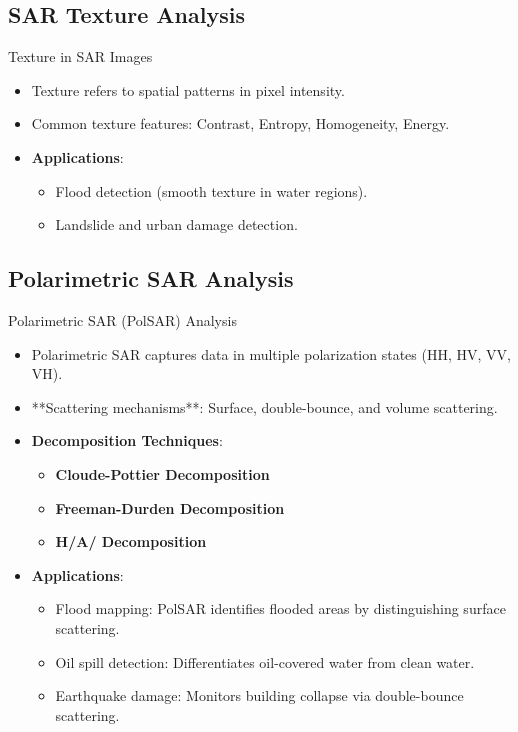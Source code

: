\documentclass[10pt]{beamer}
\begin{document}
\subsection{SAR Texture Analysis}
\begin{frame}{Texture in SAR Images}
    \begin{itemize}
        \item Texture refers to spatial patterns in pixel intensity.
        \item Common texture features: Contrast, Entropy, Homogeneity, Energy.
        \item \textbf{Applications}: 
        \begin{itemize}
            \item Flood detection (smooth texture in water regions).
            \item Landslide and urban damage detection.
        \end{itemize}
    \end{itemize}
\end{frame}

\subsection{Polarimetric SAR Analysis}
\begin{frame}{Polarimetric SAR (PolSAR) Analysis}
    \begin{itemize}
        \item Polarimetric SAR captures data in multiple polarization states (HH, HV, VV, VH).
        \item **Scattering mechanisms**: Surface, double-bounce, and volume scattering.
        \item \textbf{Decomposition Techniques}:
        \begin{itemize}
            \item \textbf{Cloude-Pottier Decomposition}
            \item \textbf{Freeman-Durden Decomposition}
            \item \textbf{H/A/ Decomposition}
        \end{itemize}
        \item \textbf{Applications}:
        \begin{itemize}
            \item Flood mapping: PolSAR identifies flooded areas by distinguishing surface scattering.
            \item Oil spill detection: Differentiates oil-covered water from clean water.
            \item Earthquake damage: Monitors building collapse via double-bounce scattering.
        \end{itemize}
    \end{itemize}
\end{frame}
\end{document}

